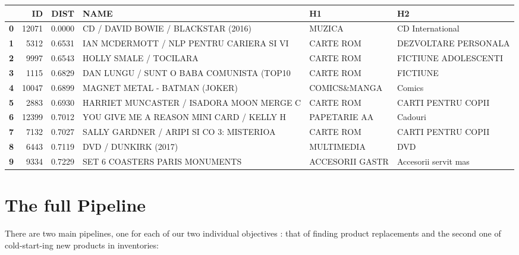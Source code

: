 \documentclass[11pt]{article}
\begin{document}
	
		
    \scriptsize
\begin{tabular}{lrrlll}
\toprule
{} &     ID &    DIST &                                      NAME &               H1 &                    H2 \\
\midrule
\textbf{0} &  12071 &  0.0000 &       CD / DAVID BOWIE / BLACKSTAR (2016) &           MUZICA &      CD International \\
\textbf{1} &   5312 &  0.6531 &  IAN MCDERMOTT / NLP PENTRU CARIERA SI VI &        CARTE ROM &  DEZVOLTARE PERSONALA \\
\textbf{2} &   9997 &  0.6543 &                    HOLLY SMALE / TOCILARA &        CARTE ROM &  FICTIUNE ADOLESCENTI \\
\textbf{3} &   1115 &  0.6829 &  DAN LUNGU / SUNT O BABA COMUNISTA (TOP10 &        CARTE ROM &              FICTIUNE \\
\textbf{4} &  10047 &  0.6899 &             MAGNET METAL - BATMAN (JOKER) &     COMICS\&MANGA &                Comics \\
\textbf{5} &   2883 &  0.6930 &  HARRIET MUNCASTER / ISADORA MOON MERGE C &        CARTE ROM &    CARTI PENTRU COPII \\
\textbf{6} &  12399 &  0.7012 &  YOU GIVE ME A REASON MINI CARD / KELLY H &     PAPETARIE AA &               Cadouri \\
\textbf{7} &   7132 &  0.7027 &  SALLY GARDNER / ARIPI SI CO 3: MISTERIOA &        CARTE ROM &    CARTI PENTRU COPII \\
\textbf{8} &   6443 &  0.7119 &                      DVD / DUNKIRK (2017) &       MULTIMEDIA &                   DVD \\
\textbf{9} &   9334 &  0.7229 &            SET 6 COASTERS PARIS MONUMENTS &  ACCESORII GASTR &  Accesorii servit mas \\
\bottomrule
\end{tabular}


    
	

    \hypertarget{the-full-pipeline}{%
\section{The full Pipeline}\label{the-full-pipeline}}

There are two main pipelines, one for each of our two individual
objectives : that of finding product replacements and the second one of
cold-start-ing new products in inventories:
\end{document}
